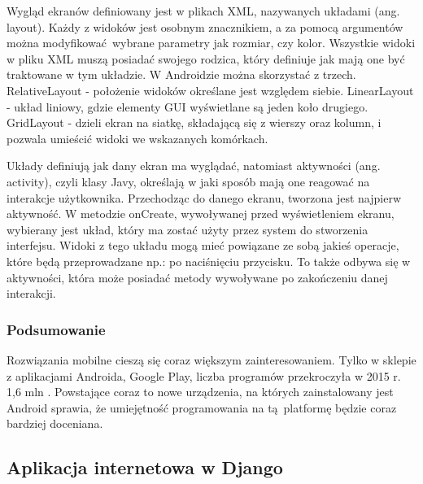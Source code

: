 Wygląd ekranów definiowany jest w plikach XML, nazywanych układami (ang. layout). Każdy z widoków jest osobnym znacznikiem, a za pomocą argumentów można modyfikować wybrane parametry jak rozmiar, czy kolor. Wszystkie widoki w pliku XML muszą posiadać swojego rodzica, który definiuje jak mają one być traktowane w tym układzie. W Androidzie można skorzystać z trzech. RelativeLayout - położenie widoków określane jest względem siebie. LinearLayout - układ liniowy, gdzie elementy GUI wyświetlane są jeden koło drugiego. GridLayout - dzieli ekran na siatkę, składającą się z wierszy oraz kolumn, i pozwala umieścić widoki we wskazanych komórkach.

Układy definiują jak dany ekran ma wyglądać, natomiast aktywności (ang. activity), czyli klasy Javy, określają w jaki sposób mają one reagować na interakcje użytkownika. Przechodząc do danego ekranu, tworzona jest najpierw aktywność. W metodzie onCreate, wywoływanej przed wyświetleniem ekranu, wybierany jest układ, który ma zostać użyty przez system do stworzenia interfejsu. Widoki z tego układu mogą mieć powiązane ze sobą jakieś operacje, które będą przeprowadzane np.: po naciśnięciu przycisku. To także odbywa się w aktywności, która może posiadać metody wywoływane po zakończeniu danej interakcji.

\subsubsection*{Podsumowanie}
Rozwiązania mobilne cieszą się coraz większym zainteresowaniem. Tylko w sklepie z aplikacjami Androida, Google Play, liczba programów przekroczyła w 2015 r. 1,6 mln \cite{biblia_ebiznesu_2}. Powstające coraz to nowe urządzenia, na których zainstalowany jest Android sprawia, że umiejętność programowania na tą platformę będzie coraz bardziej doceniana.


\subsection{Aplikacja internetowa w Django}
